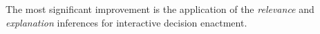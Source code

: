 The most significant improvement is the application of the  \textit{relevance} and \textit{explanation} inferences for interactive decision enactment. 

